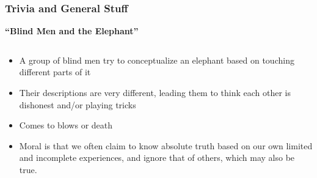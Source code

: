 \documentclass[10pt]{beamer}
\begin{document}
\begin{frame}[t]
\frametitle{Trivia and General Stuff}
\vspace{0.25cm}
	
	\begin{center}
		\textbf{``Blind Men and the Elephant''}	
	\end{center}

	\vspace{0.25cm}
	
	\begin{columns}
		\begin{column}{0.6\textwidth}
			\begin{itemize}
				\item A group of blind men try to conceptualize an elephant based on touching different parts of it
				\smallskip
				\item Their descriptions are very different, leading them to think each other is dishonest and/or playing tricks
				\smallskip
				\item Comes to blows or death
				\smallskip
				\item Moral is that we often claim to know absolute truth based on our own limited and incomplete experiences, and ignore that of others, which may also be true.
			\end{itemize}
		\end{column}
	

\end{columns}
\end{frame}
\end{document}
